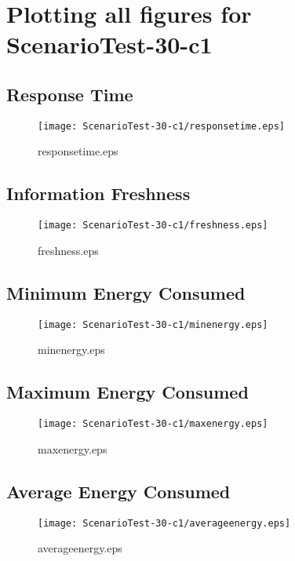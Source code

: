 \documentclass{elsart}
\begin{document}
\section{Plotting all figures for ScenarioTest-30-c1}
\subsection{Response Time}

\begin{figure}[ht]
\centering
\texttt{[image: ScenarioTest-30-c1/responsetime.eps]}
\caption{responsetime.eps}\label{fig:responsetime}
\end{figure}

\clearpage
\subsection{Information Freshness}

\begin{figure}[ht]
\centering
\texttt{[image: ScenarioTest-30-c1/freshness.eps]}
\caption{freshness.eps}\label{fig:freshness}
\end{figure}

\clearpage
\subsection{Minimum Energy Consumed}

\begin{figure}[ht]
\centering
\texttt{[image: ScenarioTest-30-c1/minenergy.eps]}
\caption{minenergy.eps}\label{fig:minenergy}
\end{figure}

\clearpage
\subsection{Maximum Energy Consumed}

\begin{figure}[ht]
\centering
\texttt{[image: ScenarioTest-30-c1/maxenergy.eps]}
\caption{maxenergy.eps}\label{fig:maxenergy}
\end{figure}

\clearpage
\subsection{Average Energy Consumed}

\begin{figure}[ht]
\centering
\texttt{[image: ScenarioTest-30-c1/averageenergy.eps]}
\caption{averageenergy.eps}\label{fig:averageenergy}
\end{figure}
\end{document}

